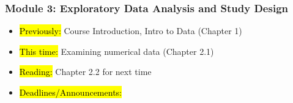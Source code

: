 
\begin{frame}
    \frametitle{Module 3: Exploratory Data Analysis and Study Design}
    \begin{itemize}
        \item \hl{Previously: } Course Introduction, Intro to Data (Chapter 1)
        \item \hl{This time: } Examining numerical data (Chapter 2.1)
        \item \hl{Reading: } Chapter 2.2 for next time
        \item \hl{Deadlines/Announcements: } 
    \end{itemize}
    
    \end{frame}
    